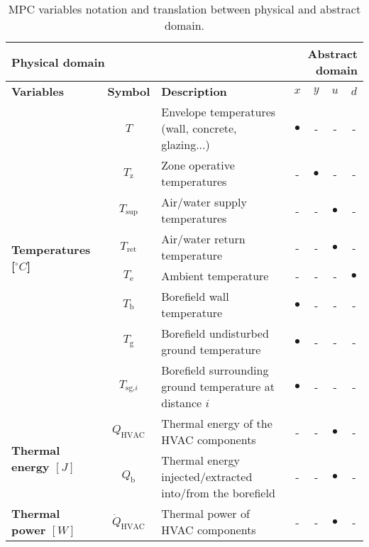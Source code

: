 \documentclass[10pt]{extarticle}
\begin{document}
\begin{table}[h]
	\centering
	\caption{MPC variables notation and translation between physical and abstract domain.}
	\label{tab:mpc_form:translation}
	\begin{adjustwidth}{-1cm}{}
	\begin{tabular}{l|c|l|cccc}
		\toprule
		\multicolumn{3}{l}{\textbf{Physical domain}} &  \multicolumn{4}{r}{\textbf{Abstract domain}} \\
		\toprule
		\textbf{Variables} & \textbf{Symbol} & \textbf{Description} & \textbf{$x$} & \textbf{$y$} & \textbf{$u$} & \textbf{$d$}  \\ 
		\midrule
		\multirow{8}{*}{\textbf{Temperatures [$^\circ C$]}} & $T$ & Envelope temperatures (wall, concrete, glazing...) & $\bullet$ & -  & - & - \\ 
		& $T_{\text{z}}$ & Zone operative temperatures  & - & $\bullet$ & -  & - \\
		& $T_{\text{sup}}$ & Air/water supply temperatures &  - & - & $\bullet$ & -  \\
		& $T_{\text{ret}}$ & Air/water return temperature &  - & - & $\bullet$ & - \\
		& $T_\text{e}$ & Ambient temperature &  - & - & - & $\bullet$ \\
		& $T_\text{b}$ & Borefield wall temperature & $\bullet$ & - & - & - \\
			& $T_\text{g}$ & Borefield undisturbed ground temperature & $\bullet$ & - & - & - \\
			& $T_{\text{sg,}i}$ & Borefield surrounding ground temperature at distance $i$ & $\bullet$ & - & - & - \\
		\midrule
		\multirow{2}{*}{\textbf{Thermal energy $[J]$}} 
		& $Q_{\text{HVAC}}$ & Thermal energy of the HVAC components  & - & - &  $\bullet$ & - \\
		& $Q_{\text{b}}$ & Thermal energy injected/extracted into/from the borefield & - & - & $\bullet$ & -  \\
		\midrule
		\multirow{5}{*}{\textbf{Thermal power $[W]$}} 
		& $\dot{Q}_{\text{HVAC}}$ & Thermal power of  HVAC components  & - & - &  $\bullet$ &- \\

\end{tabular}
\end{adjustwidth}
\end{table}
\end{document}
